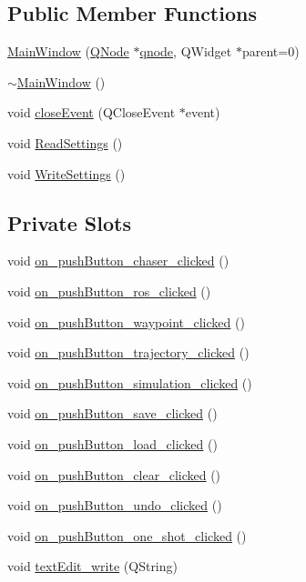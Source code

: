 \subsection*{Public Member Functions}
\begin{DoxyCompactItemize}
\item 
\hyperlink{class_main_window_a6f0a90213d93b861d43c09dd01c52962}{Main\+Window} (\hyperlink{class_q_node}{Q\+Node} $\ast$\hyperlink{class_main_window_ac9d45be6e40fe6917339119e15c1b120}{qnode}, Q\+Widget $\ast$parent=0)
\item 
\hyperlink{class_main_window_ae98d00a93bc118200eeef9f9bba1dba7}{$\sim$\+Main\+Window} ()
\item 
void \hyperlink{class_main_window_a4e20a4a065fbb0e4d3532a45a0a91425}{close\+Event} (Q\+Close\+Event $\ast$event)
\item 
void \hyperlink{class_main_window_a4abba2c52f756524c0f388d0d3e6d6ec}{Read\+Settings} ()
\item 
void \hyperlink{class_main_window_a56a5e4d5e0a022e8c1ecf350d2916ade}{Write\+Settings} ()
\end{DoxyCompactItemize}
\subsection*{Private Slots}
\begin{DoxyCompactItemize}
\item 
void \hyperlink{class_main_window_a996e7b8e246db04a9931ea8c058eedf8}{on\+\_\+push\+Button\+\_\+chaser\+\_\+clicked} ()
\item 
void \hyperlink{class_main_window_a9aebdb686fc8f44bc84454443b094ef7}{on\+\_\+push\+Button\+\_\+ros\+\_\+clicked} ()
\item 
void \hyperlink{class_main_window_a543d311321e5dcb7a42384dd67c6bff4}{on\+\_\+push\+Button\+\_\+waypoint\+\_\+clicked} ()
\item 
void \hyperlink{class_main_window_a3cdeb477328d4aaeac315f62c632a4f2}{on\+\_\+push\+Button\+\_\+trajectory\+\_\+clicked} ()
\item 
void \hyperlink{class_main_window_aec26150ce3a1688a40230b79b088921d}{on\+\_\+push\+Button\+\_\+simulation\+\_\+clicked} ()
\item 
void \hyperlink{class_main_window_a5f2b259d7c85d5d32c1207a34d8b9af4}{on\+\_\+push\+Button\+\_\+save\+\_\+clicked} ()
\item 
void \hyperlink{class_main_window_a9c676468f012e842cd443d8029f8a242}{on\+\_\+push\+Button\+\_\+load\+\_\+clicked} ()
\item 
void \hyperlink{class_main_window_af777763ec745a8eeffe3f9925005fac1}{on\+\_\+push\+Button\+\_\+clear\+\_\+clicked} ()
\item 
void \hyperlink{class_main_window_a41e769472d468772dd3851cbd20ca9fb}{on\+\_\+push\+Button\+\_\+undo\+\_\+clicked} ()
\item 
void \hyperlink{class_main_window_a00ace1276164789fa5383e80ecbf8c6f}{on\+\_\+push\+Button\+\_\+one\+\_\+shot\+\_\+clicked} ()
\item 
void \hyperlink{class_main_window_a4513ffcd68256d01c44fa2602d4c6880}{text\+Edit\+\_\+write} (Q\+String)
\end{DoxyCompactItemize}
